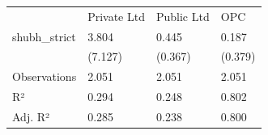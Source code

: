 \begin{tabular}{llll}
& Private Ltd & Public Ltd & OPC \\
shubh\_strict & \num{3.804} & \num{0.445} & \num{0.187} \\
& (\num{7.127}) & (\num{0.367}) & (\num{0.379}) \\
Observations & \num{2,051} & \num{2,051} & \num{2,051} \\
R² & \num{0.294} & \num{0.248} & \num{0.802} \\
Adj. R² & \num{0.285} & \num{0.238} & \num{0.800} \\
\end{tabular}

